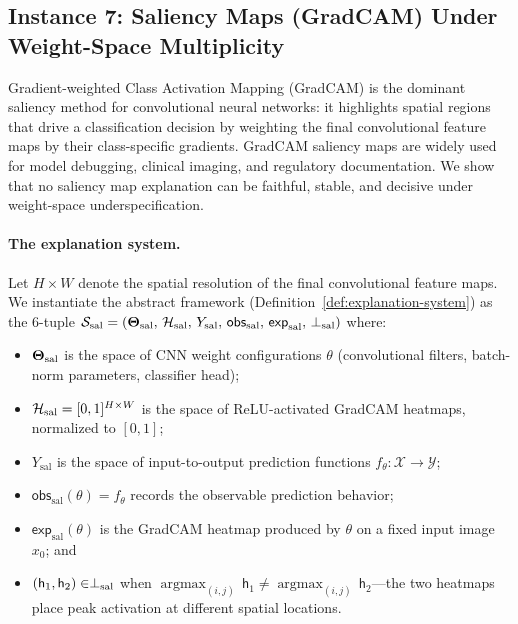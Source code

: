 \subsection{Instance 7: Saliency Maps (GradCAM) Under Weight-Space
  Multiplicity}
\label{sec:instance-gradcam}

Gradient-weighted Class Activation Mapping (GradCAM)
\citep{selvaraju2017gradcam} is the dominant saliency method for
convolutional neural networks: it highlights spatial regions that drive a
classification decision by weighting the final convolutional feature maps
by their class-specific gradients.  GradCAM saliency maps are widely used
for model debugging, clinical imaging, and regulatory documentation.  We
show that no saliency map explanation can be faithful, stable, and decisive
under weight-space underspecification.

\paragraph{The explanation system.}
Let $H \times W$ denote the spatial resolution of the final convolutional
feature maps.  We instantiate the abstract framework
(Definition~\ref{def:explanation-system}) as the 6-tuple
$\mathcal{S}_{\mathrm{sal}} = (\mathbf{\Theta}_{\mathrm{sal}},\,
\mathcal{H}_{\mathrm{sal}},\,Y_{\mathrm{sal}},\,\mathsf{obs}_{\mathrm{sal}},\,
\mathsf{exp}_{\mathrm{sal}},\,\perp_{\mathrm{sal}})$ where:
\begin{itemize}
  \item $\mathbf{\Theta}_{\mathrm{sal}}$ is the space of CNN weight configurations
    $\theta$ (convolutional filters, batch-norm parameters, classifier head);
  \item $\mathcal{H}_{\mathrm{sal}} = [0,1]^{H \times W}$ is the space of
    ReLU-activated GradCAM heatmaps, normalized to $[0,1]$;
  \item $Y_{\mathrm{sal}}$ is the space of input-to-output prediction
    functions $f_\theta : \mathcal{X} \to \mathcal{Y}$;
  \item $\mathsf{obs}_{\mathrm{sal}}(\theta) = f_\theta$ records the
    observable prediction behavior;
  \item $\mathsf{exp}_{\mathrm{sal}}(\theta)$ is the GradCAM heatmap
    produced by $\theta$ on a fixed input image $x_0$; and
  \item $(\mathsf{h}_1, \mathsf{h}_2) \in \perp_{\mathrm{sal}}$ when
    $\operatorname{argmax}_{(i,j)}\, \mathsf{h}_1 \neq
    \operatorname{argmax}_{(i,j)}\, \mathsf{h}_2$---the two heatmaps
    place peak activation at different spatial locations.
\end{itemize}

